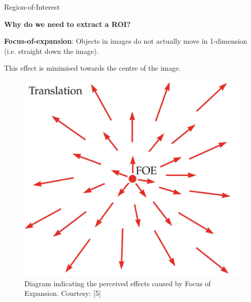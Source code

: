 \documentclass[10pt, compress]{beamer}
\begin{document}
\begin{frame}{Region-of-Interest}

\textbf{Why do we need to extract a ROI?} \\ \vspace{0.5cm}

\textbf{Focus-of-expansion}: Objects in images do not actually move in 1-dimension (i.e. straight down the image). \\ \vspace{0.2cm}

This effect is minimised towards the centre of the image.

\begin{figure}[ht!]
\centering
\includegraphics[scale=0.15]{foe.png}
\caption{Diagram indicating the perceived effects caused by Focus of Expansion. Courtesy: [5]}
  \end{figure}
  
\end{frame}
\end{document}
